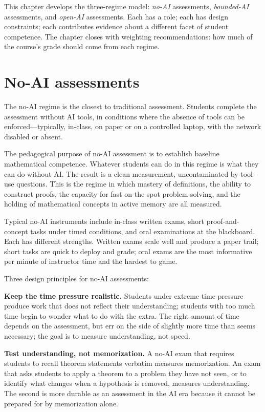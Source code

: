 \documentclass[11pt]{book}
\begin{document}
This chapter develops the three-regime model: \emph{no-AI} assessments, \emph{bounded-AI} assessments, and \emph{open-AI} assessments. Each has a role; each has design constraints; each contributes evidence about a different facet of student competence. The chapter closes with weighting recommendations: how much of the course's grade should come from each regime.

\section{No-AI assessments}

The no-AI regime is the closest to traditional assessment. Students complete the assessment without AI tools, in conditions where the absence of tools can be enforced---typically, in-class, on paper or on a controlled laptop, with the network disabled or absent.

The pedagogical purpose of no-AI assessment is to establish baseline mathematical competence. Whatever students can do in this regime is what they can do without AI. The result is a clean measurement, uncontaminated by tool-use questions. This is the regime in which mastery of definitions, the ability to construct proofs, the capacity for fast on-the-spot problem-solving, and the holding of mathematical concepts in active memory are all measured.

Typical no-AI instruments include in-class written exams, short proof-and-concept tasks under timed conditions, and oral examinations at the blackboard. Each has different strengths. Written exams scale well and produce a paper trail; short tasks are quick to deploy and grade; oral exams are the most informative per minute of instructor time and the hardest to game.

Three design principles for no-AI assessments:

\textbf{Keep the time pressure realistic.} Students under extreme time pressure produce work that does not reflect their understanding; students with too much time begin to wonder what to do with the extra. The right amount of time depends on the assessment, but err on the side of slightly more time than seems necessary; the goal is to measure understanding, not speed.

\textbf{Test understanding, not memorization.} A no-AI exam that requires students to recall theorem statements verbatim measures memorization. An exam that asks students to apply a theorem to a problem they have not seen, or to identify what changes when a hypothesis is removed, measures understanding. The second is more durable as an assessment in the AI era because it cannot be prepared for by memorization alone.
\end{document}
